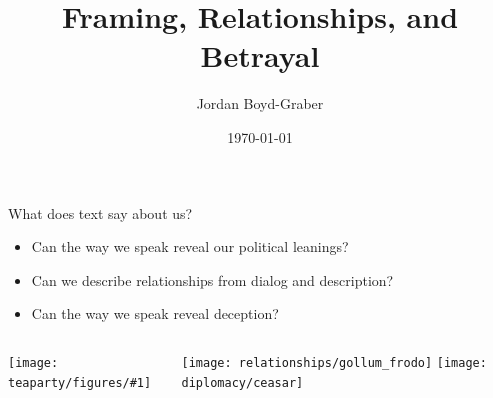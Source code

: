 \documentclass[xcolor=dvipsnames]{beamer}
\title{Framing, Relationships, and Betrayal}
\author{Jordan Boyd-Graber}
\date{\today}
\institute[] %
{University of Maryland}
\newcommand{\gfxtp}[2]{
\begin{center}
	\texttt{[image: teaparty/figures/\#1]}
\end{center}
}
\begin{document}

\frame{
\titlepage
\tiny
}



\begin{frame}{What does text say about us?}

  \begin{itemize}
    \item Can the way we speak reveal our \alert<1>{political leanings}?
    \item Can we describe \alert<2>{relationships} from dialog and description?
    \item Can the way we speak reveal \alert<3>{deception}?
  \end{itemize}

  \begin{columns}
    \gfxtp{polarization_1}{.7}
    \texttt{[image: relationships/gollum\_frodo]}
    \texttt{[image: diplomacy/ceasar]}
    \end{columns}

\end{frame}


\end{document}
